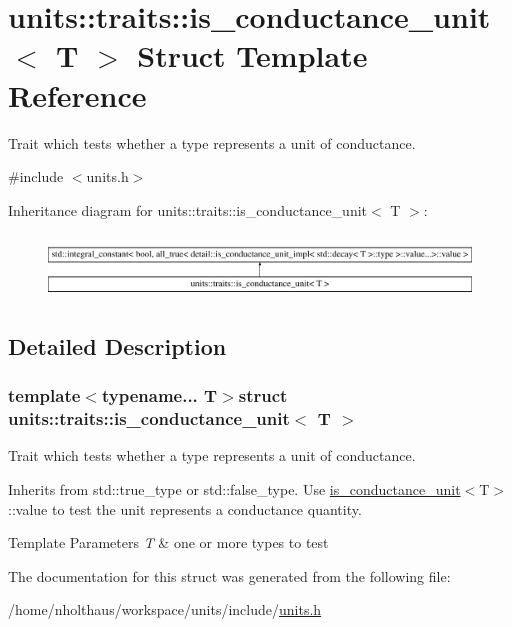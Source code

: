 \hypertarget{structunits_1_1traits_1_1is__conductance__unit}{}\section{units\+:\+:traits\+:\+:is\+\_\+conductance\+\_\+unit$<$ T $>$ Struct Template Reference}
\label{structunits_1_1traits_1_1is__conductance__unit}


Trait which tests whether a type represents a unit of conductance.  




{\ttfamily \#include $<$units.\+h$>$}

Inheritance diagram for units\+:\+:traits\+:\+:is\+\_\+conductance\+\_\+unit$<$ T $>$\+:\begin{figure}[H]
\begin{center}
\leavevmode
\includegraphics[height=1.684211cm]{structunits_1_1traits_1_1is__conductance__unit}
\end{center}
\end{figure}


\subsection{Detailed Description}
\subsubsection*{template$<$typename... T$>$struct units\+::traits\+::is\+\_\+conductance\+\_\+unit$<$ T $>$}

Trait which tests whether a type represents a unit of conductance. 

Inherits from {\ttfamily std\+::true\+\_\+type} or {\ttfamily std\+::false\+\_\+type}. Use {\ttfamily \hyperlink{structunits_1_1traits_1_1is__conductance__unit}{is\+\_\+conductance\+\_\+unit}$<$T$>$\+::value} to test the unit represents a conductance quantity. 
\begin{DoxyTemplParams}{Template Parameters}
{\em T} & one or more types to test \\
\hline
\end{DoxyTemplParams}


The documentation for this struct was generated from the following file\+:\begin{DoxyCompactItemize}
\item 
/home/nholthaus/workspace/units/include/\hyperlink{units_8h}{units.\+h}\end{DoxyCompactItemize}
